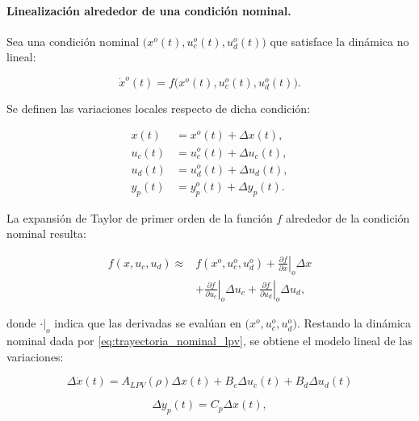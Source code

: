 \documentclass[10pt,a4paper]{article}
\begin{document}
\paragraph{Linealización alrededor de una condición nominal.}
Sea una condición nominal
$\bigl(x^o(t),u_c^o(t),u_d^o(t)\bigr)$
que satisface la dinámica no lineal:

\begin{equation}
	\dot{x}^o(t)
	=
	f\bigl(x^o(t),u_c^o(t),u_d^o(t)\bigr).
	\label{eq:trayectoria_nominal_lpv}
\end{equation}

Se definen las variaciones locales respecto de dicha condición:

\begin{equation}
	\begin{aligned}
		x(t) &= x^o(t)+\Delta x(t),\\
		u_c(t) &= u_c^o(t)+\Delta u_c(t),\\
		u_d(t) &= u_d^o(t)+\Delta u_d(t),\\
		y_p(t) &= y_p^o(t)+\Delta y_p(t).
	\end{aligned}
	\label{eq:variables_incrementales_lpv}
\end{equation}

La expansión de Taylor de primer orden de la función $f$ alrededor de la condición nominal resulta:

\begin{equation}
	\begin{aligned}
		f(x,u_c,u_d)\approx {}&
		f(x^o,u_c^o,u_d^o)
		+\left.\frac{\partial f}{\partial x}\right|_o\Delta x\\
		&+\left.\frac{\partial f}{\partial u_c}\right|_o\Delta u_c
		+\left.\frac{\partial f}{\partial u_d}\right|_o\Delta u_d,
	\end{aligned}
\end{equation}

donde $\left.\cdot\right|_o$ indica que las derivadas se evalúan en
$\bigl(x^o,u_c^o,u_d^o\bigr)$.
Restando la dinámica nominal dada por \eqref{eq:trayectoria_nominal_lpv}, se obtiene el modelo lineal de las variaciones:

\begin{equation}
	\boxed{
		\Delta\dot{x}(t)
		=
		A_{LPV}(\rho)\Delta x(t)
		+B_c\Delta u_c(t)
		+B_d\Delta u_d(t)
	}
	\label{eq:modelo_incremental_lpv_6}
\end{equation}

\begin{equation}
	\Delta y_p(t)=C_p\Delta x(t),
	\label{eq:salida_incremental_lpv_6}
\end{equation}
\end{document}
